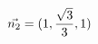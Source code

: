 \documentclass[preview]{standalone}
\begin{document}
\begin{align*}
\special{dvisvgm:raw <g id='unique000'>}\vec{n_2}=(1,\frac{\sqrt{3}}{3},1)\special{dvisvgm:raw </g>}
\end{align*}
\end{document}
